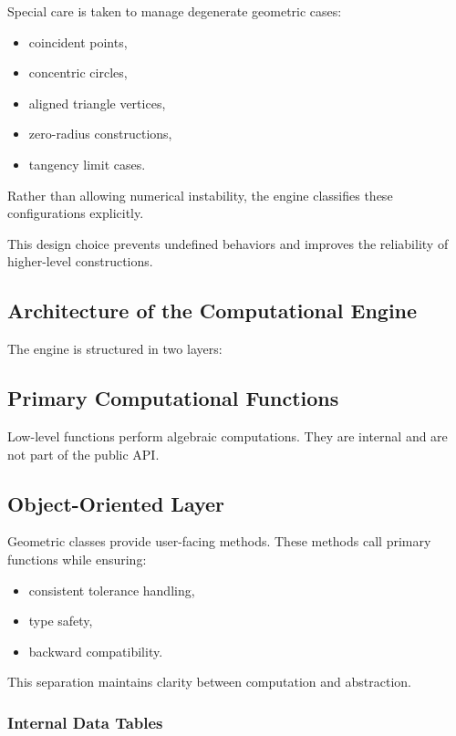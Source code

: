 Special care is taken to manage degenerate geometric cases:

\begin{itemize}
\item coincident points,
\item concentric circles,
\item aligned triangle vertices,
\item zero-radius constructions,
\item tangency limit cases.
\end{itemize}

Rather than allowing numerical instability, the engine classifies these
configurations explicitly.

This design choice prevents undefined behaviors and improves the reliability
of higher-level constructions.

\subsection{Architecture of the Computational Engine}

The engine is structured in two layers:

\subsection*{Primary Computational Functions}

Low-level functions perform algebraic computations.
They are internal and are not part of the public API.

\subsection*{Object-Oriented Layer}

Geometric classes provide user-facing methods.
These methods call primary functions while ensuring:

\begin{itemize}
\item consistent tolerance handling,
\item type safety,
\item backward compatibility.
\end{itemize}

This separation maintains clarity between computation and abstraction.

\subsubsection{Internal Data Tables}

